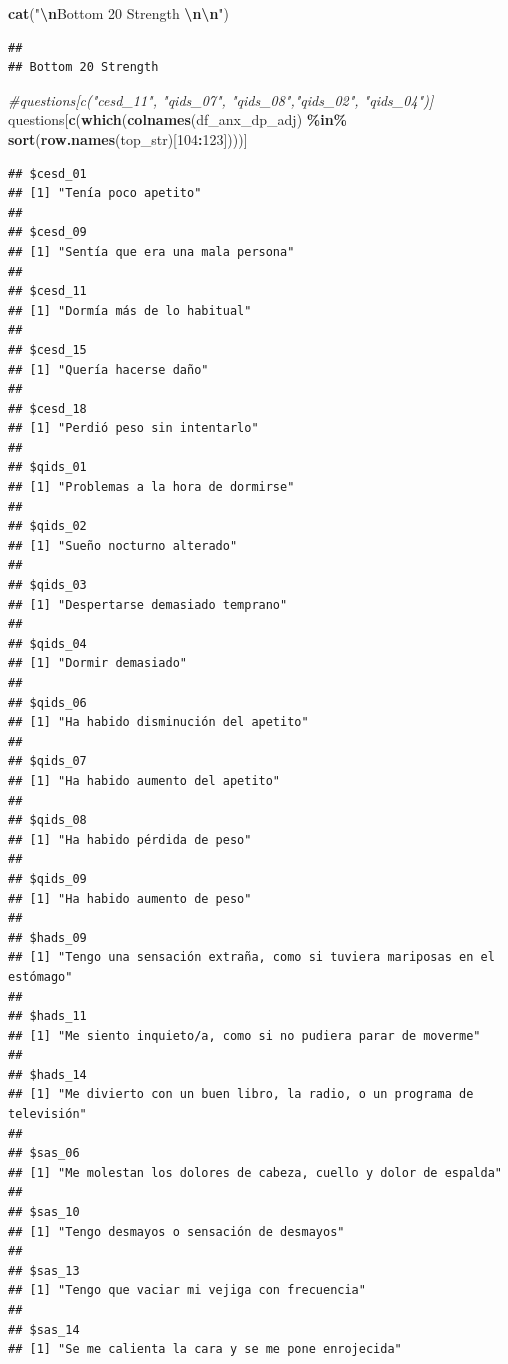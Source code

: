 \documentclass[
]{article}
\newenvironment{Shaded}{\begin{snugshade}}{\end{snugshade}}
\newcommand{\CommentTok}[1]{\textcolor[rgb]{0.56,0.35,0.01}{\textit{#1}}}
\newcommand{\DecValTok}[1]{\textcolor[rgb]{0.00,0.00,0.81}{#1}}
\newcommand{\FunctionTok}[1]{\textcolor[rgb]{0.13,0.29,0.53}{\textbf{#1}}}
\newcommand{\NormalTok}[1]{#1}
\newcommand{\SpecialCharTok}[1]{\textcolor[rgb]{0.81,0.36,0.00}{\textbf{#1}}}
\newcommand{\StringTok}[1]{\textcolor[rgb]{0.31,0.60,0.02}{#1}}
\begin{document}
\begin{Shaded}
\begin{Highlighting}[]
\FunctionTok{cat}\NormalTok{(}\StringTok{"}\SpecialCharTok{\textbackslash{}n}\StringTok{Bottom 20 Strength }\SpecialCharTok{\textbackslash{}n\textbackslash{}n}\StringTok{"}\NormalTok{)}
\end{Highlighting}
\end{Shaded}

\begin{verbatim}
## 
## Bottom 20 Strength
\end{verbatim}

\begin{Shaded}
\begin{Highlighting}[]
\CommentTok{\#questions[c("cesd\_11", "qids\_07", "qids\_08","qids\_02", "qids\_04")] }
\NormalTok{questions[}\FunctionTok{c}\NormalTok{(}\FunctionTok{which}\NormalTok{(}\FunctionTok{colnames}\NormalTok{(df\_anx\_dp\_adj) }\SpecialCharTok{\%in\%} \FunctionTok{sort}\NormalTok{(}\FunctionTok{row.names}\NormalTok{(top\_str)[}\DecValTok{104}\SpecialCharTok{:}\DecValTok{123}\NormalTok{])))] }
\end{Highlighting}
\end{Shaded}

\begin{verbatim}
## $cesd_01
## [1] "Tenía poco apetito"
## 
## $cesd_09
## [1] "Sentía que era una mala persona"
## 
## $cesd_11
## [1] "Dormía más de lo habitual"
## 
## $cesd_15
## [1] "Quería hacerse daño"
## 
## $cesd_18
## [1] "Perdió peso sin intentarlo"
## 
## $qids_01
## [1] "Problemas a la hora de dormirse"
## 
## $qids_02
## [1] "Sueño nocturno alterado"
## 
## $qids_03
## [1] "Despertarse demasiado temprano"
## 
## $qids_04
## [1] "Dormir demasiado"
## 
## $qids_06
## [1] "Ha habido disminución del apetito"
## 
## $qids_07
## [1] "Ha habido aumento del apetito"
## 
## $qids_08
## [1] "Ha habido pérdida de peso"
## 
## $qids_09
## [1] "Ha habido aumento de peso"
## 
## $hads_09
## [1] "Tengo una sensación extraña, como si tuviera mariposas en el estómago"
## 
## $hads_11
## [1] "Me siento inquieto/a, como si no pudiera parar de moverme"
## 
## $hads_14
## [1] "Me divierto con un buen libro, la radio, o un programa de televisión"
## 
## $sas_06
## [1] "Me molestan los dolores de cabeza, cuello y dolor de espalda"
## 
## $sas_10
## [1] "Tengo desmayos o sensación de desmayos"
## 
## $sas_13
## [1] "Tengo que vaciar mi vejiga con frecuencia"
## 
## $sas_14
## [1] "Se me calienta la cara y se me pone enrojecida"
\end{verbatim}
\end{document}

